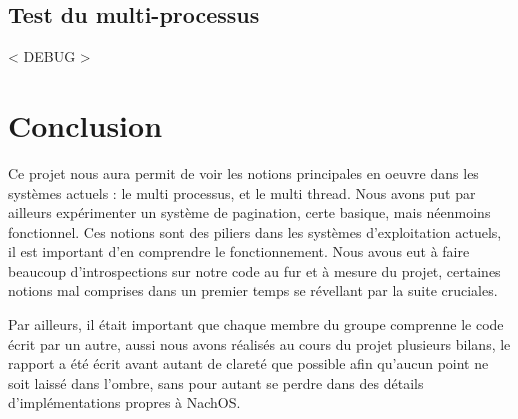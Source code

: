 \documentclass[a4paper,10pt]{article}
\begin{document}
\subsection{Test du multi-processus}

< DEBUG >
\newpage
\section{Conclusion}
Ce projet nous aura permit de voir les notions principales en oeuvre dans les systèmes actuels : le multi processus, et le multi thread. Nous avons put par ailleurs expérimenter un système de pagination, certe basique, mais néenmoins fonctionnel.
Ces notions sont des piliers dans les systèmes d'exploitation actuels, il est important d'en comprendre le fonctionnement. Nous avous eut à faire beaucoup d'introspections sur notre code au fur et à mesure du projet, certaines notions
mal comprises dans un premier temps se révellant par la suite cruciales.

Par ailleurs, il était important que chaque membre du groupe comprenne le code écrit par un autre, aussi nous avons réalisés au cours du projet plusieurs bilans,
le rapport a été écrit avant autant de clareté que possible afin qu'aucun point ne soit laissé dans l'ombre, sans pour autant se perdre dans des détails d'implémentations propres à NachOS.
\end{document}
